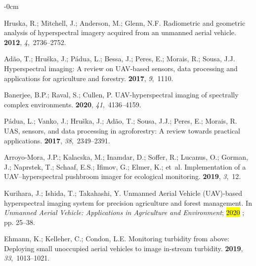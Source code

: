 \documentclass[remotesensing,article,accept,pdftex,moreauthors]{Definitions/mdpi}
\begin{document}
\begin{adjustwidth}{-\extralength}{0cm}
\begin{thebibliography}{999}
Hruska, R.; Mitchell, J.; Anderson, M.; Glenn, N.F.
\newblock Radiometric and geometric analysis of hyperspectral imagery acquired
  from an unmanned aerial vehicle.
 {\bf 2012}, {\em 4},~2736--2752.

Ad{\~a}o, T.; Hru{\v{s}}ka, J.; P{\'a}dua, L.; Bessa, J.; Peres, E.; Morais,
  R.; Sousa, J.J.
\newblock Hyperspectral imaging: A review on UAV-based sensors, data processing
  and applications for agriculture and forestry.
 {\bf 2017}, {\em 9},~1110.

Banerjee, B.P.; Raval, S.; Cullen, P.
\newblock UAV-hyperspectral imaging of spectrally complex environments.
 {\bf 2020}, {\em
  41},~4136--4159.

P{\'a}dua, L.; Vanko, J.; Hru{\v{s}}ka, J.; Ad{\~a}o, T.; Sousa, J.J.; Peres,
  E.; Morais, R.
\newblock UAS, sensors, and data processing in agroforestry: A review towards
  practical applications.
 {\bf 2017}, {\em
  38},~2349--2391.

Arroyo-Mora, J.P.; Kalacska, M.; Inamdar, D.; Soffer, R.; Lucanus, O.; Gorman,
  J.; Naprstek, T.; Schaaf, E.S.; Ifimov, G.; Elmer, K.;  et~al.
\newblock Implementation of a UAV--hyperspectral pushbroom imager for
  ecological monitoring.
 {\bf 2019}, {\em 3},~12.

Kurihara, J.; Ishida, T.; Takahashi, Y.
\newblock Unmanned Aerial Vehicle (UAV)-based hyperspectral imaging system for
  precision agriculture and forest management.
\newblock In {\em Unmanned Aerial Vehicle: Applications in Agriculture and
  Environment}; \hl{2020} %
; pp. 25--38.

Ehmann, K.; Kelleher, C.; Condon, L.E.
\newblock Monitoring turbidity from above: Deploying small unoccupied aerial
  vehicles to image in-stream turbidity.
 {\bf 2019}, {\em 33},~1013--1021.


\end{thebibliography}
\end{adjustwidth}
\end{document}
